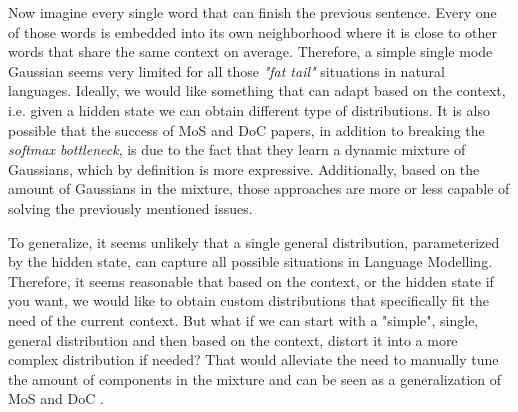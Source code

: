 Now imagine every single word that can finish the previous sentence. Every one of those words is embedded into its own neighborhood where it is close to other words that share the same context on average. Therefore, a simple single mode Gaussian seems very limited for all those \emph{"fat tail"} situations in natural languages. Ideally, we would like something that can adapt based on the context, i.e. given a hidden state we can obtain different type of distributions. It is also possible that the success of MoS \citep{yang2017breaking} and DoC \citep{takase2018direct} papers, in addition to breaking the \emph{softmax bottleneck}, is due to the fact that they learn a dynamic mixture of Gaussians, which by definition is more expressive. Additionally, based on the amount of Gaussians in the mixture, those approaches are more or less capable of solving the previously mentioned issues.

To generalize, it seems unlikely that a single general distribution, parameterized by the hidden state, can capture all possible situations in Language Modelling. Therefore, it seems reasonable that based on the context, or the hidden state if you want, we would like to obtain custom distributions that specifically fit the need of the current context. But what if we can start with a "simple", single, general distribution and then based on the context, distort it into a more complex distribution if needed? That would alleviate the need to manually tune the amount of components in the mixture and can be seen as a generalization of MoS \citep{yang2017breaking} and DoC \citep{takase2018direct}.
